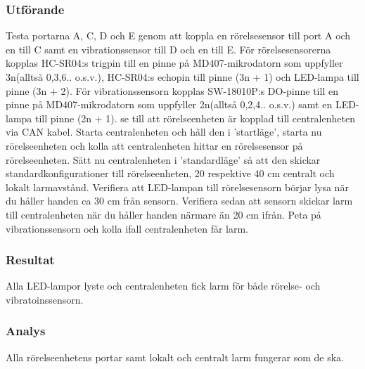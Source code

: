 \subsubsection*{Utförande}
Testa portarna A, C, D och E genom att koppla en rörelsesensor till port A och en till C samt en vibrationssensor till D och en till E. För rörelsesensorerna kopplas HC-SR04:s trigpin till en pinne på MD407-mikrodatorn som uppfyller 3n(alltså 0,3,6.. o.s.v.), HC-SR04:s echopin till pinne (3n + 1) och LED-lampa till pinne (3n + 2). 
För vibrationssensorn kopplas SW-18010P:s DO-pinne till en pinne på MD407-mikrodatorn som uppfyller 2n(alltså 0,2,4.. o.s.v.) samt en LED-lampa till pinne (2n + 1). 
se till att rörelseenheten är kopplad  till centralenheten via CAN kabel. Starta centralenheten och håll den i 'startläge', starta nu rörelseenheten och kolla att centralenheten hittar en rörelsesensor på rörelseenheten. Sätt nu centralenheten i 'standardläge' så att den skickar standardkonfigurationer till rörelseenheten, 20 respektive 40 cm centralt och lokalt larmavstånd. Verifiera att LED-lampan till rörelsesensorn börjar lysa när du håller handen ca 30 cm från sensorn. Verifiera sedan att sensorn skickar larm till centralenheten när du håller handen närmare än 20 cm ifrån. Peta på vibrationssensorn och kolla ifall centralenheten får larm.

\subsubsection*{Resultat}
Alla LED-lampor lyste och centralenheten fick larm för både rörelse- och vibratoinssensorn.


\subsubsection*{Analys}
Alla rörelseenhetens portar samt lokalt och centralt larm fungerar som de ska.


